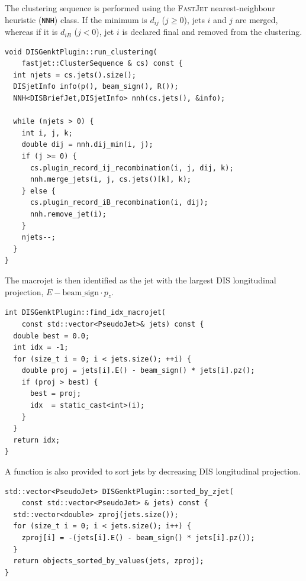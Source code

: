 The clustering sequence is performed using the \textsc{FastJet}
nearest-neighbour heuristic (\texttt{NNH}) class. If the minimum is $d_{ij}$ ($j\geq0$),
 jets $i$ and $j$ are merged, whereas if it is $d_{iB}$ ($j<0$), jet $i$ is declared
final and removed from the clustering.
\begin{lstlisting}[caption={Main clustering loop.}]
void DISGenktPlugin::run_clustering(
    fastjet::ClusterSequence & cs) const {
  int njets = cs.jets().size();
  DISjetInfo info(p(), beam_sign(), R());
  NNH<DISBriefJet,DISjetInfo> nnh(cs.jets(), &info);

  while (njets > 0) {
    int i, j, k;
    double dij = nnh.dij_min(i, j);
    if (j >= 0) {
      cs.plugin_record_ij_recombination(i, j, dij, k);
      nnh.merge_jets(i, j, cs.jets()[k], k);
    } else {
      cs.plugin_record_iB_recombination(i, dij);
      nnh.remove_jet(i);
    }
    njets--;
  }
}
\end{lstlisting}
The macrojet is then identified as the
jet with the largest DIS longitudinal projection,
$E-\mathrm{beam\_sign}\cdot p_z$.
\begin{lstlisting}[caption={Identification of the macrojet.}]
int DISGenktPlugin::find_idx_macrojet(
    const std::vector<PseudoJet>& jets) const {
  double best = 0.0;
  int idx = -1;
  for (size_t i = 0; i < jets.size(); ++i) {
    double proj = jets[i].E() - beam_sign() * jets[i].pz();
    if (proj > best) {
      best = proj;
      idx  = static_cast<int>(i);
    }
  }
  return idx;
}
\end{lstlisting}
A function is also provided to sort jets by decreasing DIS longitudinal projection.
\begin{lstlisting}[caption={Sorting jets by DIS longitudinal projection.}]
std::vector<PseudoJet> DISGenktPlugin::sorted_by_zjet(
    const std::vector<PseudoJet> & jets) const {
  std::vector<double> zproj(jets.size());
  for (size_t i = 0; i < jets.size(); i++) {
    zproj[i] = -(jets[i].E() - beam_sign() * jets[i].pz());
  }
  return objects_sorted_by_values(jets, zproj);
}
\end{lstlisting}




